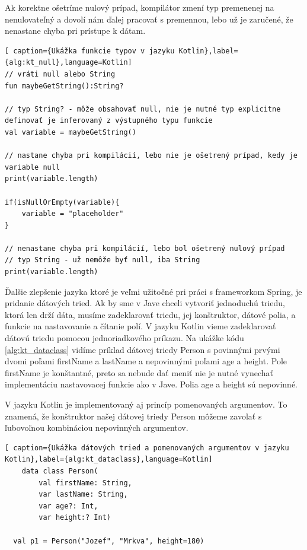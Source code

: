 Ak korektne ošetríme nulový prípad, kompilátor zmení typ premenenej na nenulovateľný a dovolí nám ďalej pracovať s premennou, lebo už je zaručené, že nenastane chyba pri prístupe k dátam. 


\begin{lstlisting}[ caption={Ukážka funkcie typov v jazyku Kotlin},label={alg:kt_null},language=Kotlin]
// vráti null alebo String
fun maybeGetString():String?

// typ String? - môže obsahovať null, nie je nutné typ explicitne definovať je inferovaný z výstupného typu funkcie
val variable = maybeGetString()

// nastane chyba pri kompilácií, lebo nie je ošetrený prípad, kedy je variable null
print(variable.length)

if(isNullOrEmpty(variable){
	variable = "placeholder"
}

// nenastane chyba pri kompilácií, lebo bol ošetrený nulový prípad
// typ String - už nemôže byť null, iba String
print(variable.length)
\end{lstlisting}


Ďalšie zlepšenie jazyka ktoré je veľmi užitočné pri práci s frameworkom Spring, je pridanie dátových tried. Ak by sme v Jave chceli vytvoriť jednoduchú triedu, ktorá len drží dáta, musíme zadeklarovať triedu, jej konštruktor, dátové polia, a funkcie na nastavovanie a čítanie polí. V jazyku Kotlin vieme zadeklarovať dátovú triedu pomocou jednoriadkového príkazu. Na ukážke kódu \ref{alg:kt_dataclass} vidíme príklad dátovej triedy Person s povinnými prvými dvomi poľami firstName a lastName a nepovinnými poľami age a height. Pole firstName je konštantné, preto sa nebude dať meniť nie je nutné vynechať implementáciu nastavovacej funkcie ako v Jave. Polia age a height sú nepovinné.  
 
V jazyku Kotlin je implementovaný aj princíp pomenovaných argumentov. To znamená, že konštruktor našej dátovej triedy Person môžeme zavolať s ľubovoľnou kombináciou nepovinných argumentov. 

\begin{lstlisting}[ caption={Ukážka dátových tried a pomenovaných argumentov v jazyku Kotlin},label={alg:kt_dataclass},language=Kotlin]
	data class Person(
		val firstName: String,
		var lastName: String,
		var age?: Int,
		var height:? Int)

  val p1 = Person("Jozef", "Mrkva", height=180)		
	\end{lstlisting}



